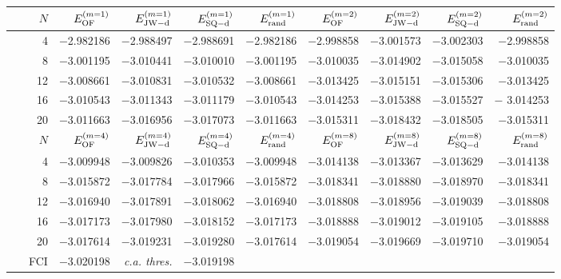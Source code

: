 \documentclass[journal=jctcce,manuscript=article]{achemso}
\begin{document}
\begin{table*}[!ht]
\begin{tabular*}{\columnwidth}{@{\extracolsep{\fill}}*{1}{r}*{8}{r}@{}}
 \hline
 \toprule
     $N$    &    $E^{(m=1)}_{\rm{OF}}$    &    $E^{(m=1)}_{\rm{JW-d}}$    &    $E^{(m=1)}_{\rm{SQ-d}}$    &    $E^{(m=1)}_{\rm{rand}}$     &     $E^{(m=2)}_{\rm{OF}}$    &    $E^{(m=2)}_{\rm{JW-d}}$     &   $E^{(m=2)}_{\rm{SQ-d}}$    &     $E^{(m=2)}_{\rm{rand}}$       \\
\midrule
    4    &    $-$2.982186    &    $-$2.988497   &   $-$2.988691   &   $-$2.982186   &    $-$2.998858   &    $-$3.001573    &  $-$3.002303    &   $-$2.998858  \\
    8    &    $-$3.001195	  &    $-$3.010441   &   $-$3.010010   &   $-$3.001195   &    $-$3.010035   &    $-$3.014902     &  $-$3.015058   &   $-$3.010035  \\	
  12    &    $-$3.008661	  &    $-$3.010831   &   $-$3.010532   &   $-$3.008661   &    $-$3.013425   &    $-$3.015151   &   $-$3.015306    &   $-$3.013425  \\
  16    &    $-$3.010543	  &    $-$3.011343   &   $-$3.011179   &   $-$3.010543   &    $-$3.014253   &    $-$3.015388   &   $-$3.015527    &   $-$ 3.014253  \\
  20    &    $-$3.011663    &    $-$3.016956   &   $-$3.017073   &    $-$3.011663  &    $-$3.015311   &    $-$3.018432   &    $-$3.018505   &    $-$3.015311  \\
\hline
\toprule
  $N$    &     $E^{(m=4)}_{\rm{OF}}$    &   $E^{(m=4)}_{\rm{JW-d}}$    &   $E^{(m=4)}_{\rm{SQ-d}}$   &   $E^{(m=4)}_{\rm{rand}}$   &     $E^{(m=8)}_{\rm{OF}}$    &   $E^{(m=8)}_{\rm{JW-d}}$    &   $E^{(m=8)}_{\rm{SQ-d}}$   &   $E^{(m=8)}_{\rm{rand}}$   \\
  \midrule
  4      &   $-$3.009948   &    $-$3.009826    &    $-$3.010353   &   $-$3.009948      &   $-$3.014138    &   $-$3.013367    &   $-$3.013629    &   $-$3.014138  \\
  8      &   $-$3.015872   &    $-$3.017784    &    $-$3.017966   &   $-$3.015872      &   $-$3.018341    &   $-$3.018880    &   $-$3.018970    &   $-$3.018341  \\
  12    &   $-$3.016940   &    $-$3.017891    &   $-$3.018062    &   $-$3.016940      &   $-$3.018808    &   $-$3.018956    &   $-$3.019039    &   $-$3.018808  \\
  16    &   $-$3.017173   &    $-$3.017980    &   $-$3.018152    &   $-$3.017173      &   $-$3.018888    &   $-$3.019012    &   $-$3.019105    &   $-$3.018888  \\ 
  20    &    $-$3.017614  &    $-$3.019231    &   $-$3.019280    &   $-$3.017614     &    $-$3.019054   &    $-$3.019669   &    $-$3.019710     &    $-$3.019054   \\[3pt]
  
~~~FCI       &  $-$3.020198    &   \textit{c.a. thres.}      &    $-$3.019198    \\%
\bottomrule
\hline

\end{tabular*}
\label{table_GSE}
\end{table*}
\end{document}
